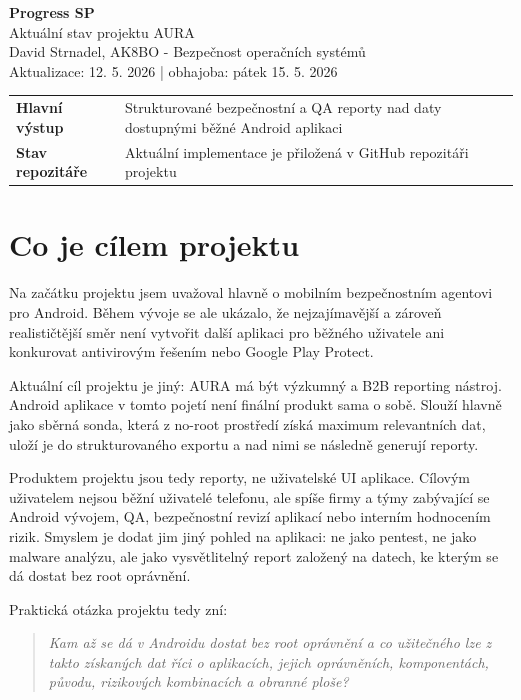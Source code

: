\documentclass[11pt,a4paper]{article}
\begin{document}
\pagecolor{white}
\color{black}

\begin{center}
  {\LARGE \textbf{Progress SP}}\\[3pt]
  {\large Aktuální stav projektu AURA}\\[8pt]
  {\color{AuraMuted} David Strnadel, AK8BO - Bezpečnost operačních systémů}\\
  {\color{AuraMuted} Aktualizace: 12. 5. 2026 \quad | \quad obhajoba: pátek 15. 5. 2026}
\end{center}

\vspace{4pt}

\begin{tabularx}{\textwidth}{>{\bfseries}p{36mm}X}
Hlavní výstup & Strukturované bezpečnostní a QA reporty nad daty dostupnými běžné Android aplikaci \\
Stav repozitáře & Aktuální implementace je přiložená v GitHub repozitáři projektu \\
\end{tabularx}

\section{Co je cílem projektu}

Na začátku projektu jsem uvažoval hlavně o mobilním bezpečnostním agentovi pro Android. Během vývoje se ale ukázalo, že nejzajímavější a zároveň realističtější směr není vytvořit další aplikaci pro běžného uživatele ani konkurovat antivirovým řešením nebo Google Play Protect.

Aktuální cíl projektu je jiný: AURA má být výzkumný a B2B reporting nástroj. Android aplikace v tomto pojetí není finální produkt sama o sobě. Slouží hlavně jako sběrná sonda, která z no-root prostředí získá maximum relevantních dat, uloží je do strukturovaného exportu a nad nimi se následně generují reporty.

Produktem projektu jsou tedy reporty, ne uživatelské UI aplikace. Cílovým uživatelem nejsou běžní uživatelé telefonu, ale spíše firmy a týmy zabývající se Android vývojem, QA, bezpečnostní revizí aplikací nebo interním hodnocením rizik. Smyslem je dodat jim jiný pohled na aplikaci: ne jako pentest, ne jako malware analýzu, ale jako vysvětlitelný report založený na datech, ke kterým se dá dostat bez root oprávnění.

Praktická otázka projektu tedy zní:

\begin{quote}
\textit{Kam až se dá v Androidu dostat bez root oprávnění a co užitečného lze z takto získaných dat říci o aplikacích, jejich oprávněních, komponentách, původu, rizikových kombinacích a obranné ploše?}
\end{quote}
\end{document}
